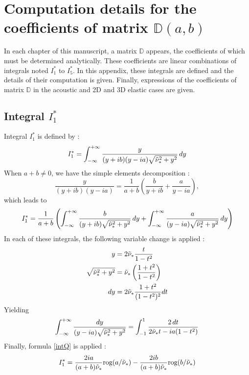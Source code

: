 \chapter{Computation details for the coefficients of matrix $\mathbb{D}(a,b)$}
\label{matD}
In each chapter of this manuscript, a matrix $\mathbb{D}$ appears, the coefficients of which must be determined analytically. These coefficients are linear combinations of integrals noted $I_1^*$ to $I_5^*$. In this appendix, these integrals are defined and the details of their computation is given. Finally, expressions of the coefficients of matrix $\mathbb{D}$ in the acoustic and 2D and 3D elastic cases are given.

\section{Integral $I_1^*$}
\label{calcI1}
Integral $I_1^*$ is defined by :
\begin{equation}
\label{defI1}
I_1^*=\int_{-\infty}^{+\infty} \frac{y}{(y+ib)(y-ia)\sqrt{\tilde{\nu}_*^2+y^2}}\,dy
\end{equation}
When $a+b \neq 0$, we have the simple elements decomposition :
\begin{equation}
\frac{y}{(y+ib)(y-ia)}=\frac{1}{a+b} \left( \frac{b}{y+ib}+\frac{a}{y-ia} \right), 
\label{decomp2}
\end{equation}
which leads to
\begin{equation}
I_1^*= \frac{1}{a+b} \left( \int_{-\infty}^{+\infty} \frac{b}{(y+ib)\sqrt{\tilde{\nu}_*^2+y^2}} \,dy +\int_{-\infty}^{+\infty} \frac{a}{(y-ia)\sqrt{\tilde{\nu}_*^2+y^2}} \,dy \right)
\end{equation}
In each of these integrals, the following variable change is applied :
\begin{equation}
\begin{split}
 y&=2\tilde{\nu}_* \frac{t}{1-t^2} \\
\sqrt{\tilde{\nu}_*^2+y^2}&=\tilde{\nu}_*\left( \frac{1+t^2}{1-t^2} \right)  \\
 dy&= 2\tilde{\nu}_* \frac{1+t^2}{(1-t^2)^2}dt 
\end{split}
\label{changevar}
\end{equation}
Yielding
\begin{equation*}
\int_{-\infty}^{+\infty} \frac{dy}{(y-ia)\sqrt{\tilde{\nu}_*^2+y^2}}=\int_{-1}^1\frac{2\,dt}{2\tilde{\nu}_*t-ia(1-t^2)}
\end{equation*}
Finally, formula \eqref{intQ} is applied :
\begin{equation}
I_1^*=\frac{2ia}{(a+b)\tilde{\nu}_*}\mbox{rog}(a/\tilde{\nu}_*)-\frac{2ib}{(a+b)\tilde{\nu}_*}\mbox{rog}(b/\tilde{\nu}_*)
\label{valI1}
\end{equation}

